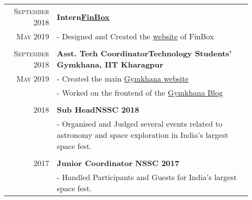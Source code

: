 \documentclass[a4paper,12pt]{extarticle} %
\let\oldtextbf\textbf
\renewcommand{\textbf}[1]{\textcolor{bold}{\oldtextbf{#1}}}
\begin{document}
\begin{tabularx}{\linewidth}{ r | X }

\textsc{September 2018} & \textbf{Intern}\hfill\textbf{\href{https://finbox.in/}{FinBox}}\\
\textsc{May 2019}& {- Designed and Created the \href{https://finbox.in/}{website} of FinBox}\\
\multicolumn{2}{c}{} \\

\textsc{September 2018} & \textbf{Asst. Tech Coordinator}\hfill\textbf{Technology Students' Gymkhana, IIT Kharagpur}\\
\textsc{May 2019}& {- Created the main \href{http://www.gymkhana.iitkgp.ac.in/index.php}{Gymkhana website} }\\
& {- Worked on the frontend of the  \href{http://www.gymkhana.iitkgp.ac.in/blog/}{Gymkhana Blog}}\\
\multicolumn{2}{c}{} \\

\textsc{2018} & \textbf{Sub Head}\hfill\textbf{NSSC 2018}\\
\textsc{}& {- Organised and Judged several events related to astronomy and space exploration in India's largest space fest.}\\
\multicolumn{2}{c}{} \\

\textsc{2017} & \textbf{Junior Coordinator} \hfill\textbf{NSSC 2017}\\
\textsc{} & {- Handled Participants and Guests for India's largest space fest.}\\
\end{tabularx}

\vspace{0.17cm}


\end{document}
